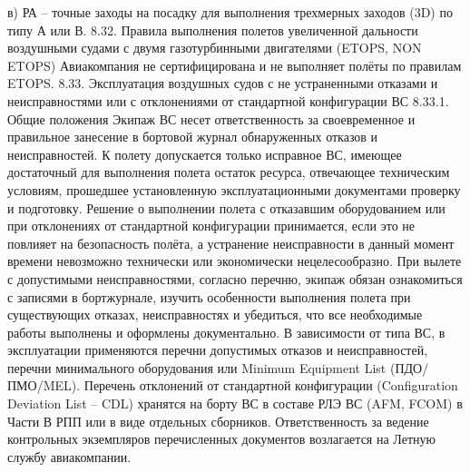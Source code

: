 в)	РА – точные заходы на посадку для выполнения трехмерных заходов (3D) по типу А или В.
8.32. Правила выполнения полетов увеличенной дальности воздушными судами с двумя газотурбинными двигателями (ETOPS, NON ETOPS)
Авиакомпания не сертифицирована и не выполняет полёты по правилам ETOPS.
8.33. Эксплуатация воздушных судов с не устраненными отказами и неисправностями или с отклонениями от стандартной конфигурации ВС
8.33.1. Общие положения
Экипаж ВС несет ответственность за своевременное и правильное занесение в бортовой журнал обнаруженных отказов и неисправностей.
К полету допускается только исправное ВС, имеющее достаточный для выполнения полета остаток ресурса, отвечающее техническим условиям, прошедшее установленную эксплуатационными документами проверку и подготовку.
Решение о выполнении полета с отказавшим оборудованием или при отклонениях от стандартной конфигурации принимается, если это не повлияет на безопасность полёта, а устранение неисправности в данный момент времени невозможно технически или экономически нецелесообразно.
При вылете с допустимыми неисправностями, согласно перечню, экипаж обязан ознакомиться с записями в бортжурнале, изучить особенности выполнения полета при существующих отказах, неисправностях и убедиться, что все необходимые работы выполнены и оформлены документально. 
В зависимости от типа ВС, в эксплуатации применяются перечни допустимых отказов и неисправностей, перечни минимального оборудования или Minimum Equipment List (ПДО/ПМО/MEL). 
Перечень отклонений от стандартной конфигурации (Configuration Deviation List – CDL) хранятся на борту ВС в составе РЛЭ ВС (AFM, FCOM) в Части В РПП или в виде отдельных сборников.
Ответственность за ведение контрольных экземпляров перечисленных документов возлагается на Летную службу авиакомпании. 



